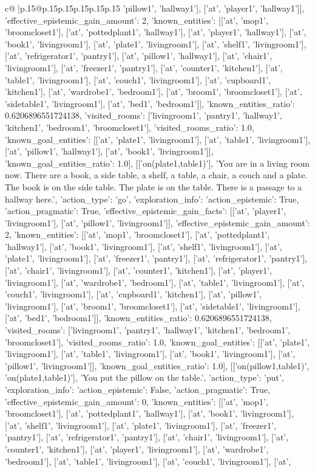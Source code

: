 \documentclass{article}
\begin{document}
{\begin{supertabular}{c@{$\;$}|p{.15\linewidth}@{}p{.15\linewidth}p{.15\linewidth}p{.15\linewidth}p{.15\linewidth}p{.15\linewidth}}
{{{'pillow1', 'hallway1'], ['at', 'player1', 'hallway1']], 'effective_epistemic_gain_amount': 2, 'known_entities': [['at', 'mop1', 'broomcloset1'], ['at', 'pottedplant1', 'hallway1'], ['at', 'player1', 'hallway1'], ['at', 'book1', 'livingroom1'], ['at', 'plate1', 'livingroom1'], ['at', 'shelf1', 'livingroom1'], ['at', 'refrigerator1', 'pantry1'], ['at', 'pillow1', 'hallway1'], ['at', 'chair1', 'livingroom1'], ['at', 'freezer1', 'pantry1'], ['at', 'counter1', 'kitchen1'], ['at', 'table1', 'livingroom1'], ['at', 'couch1', 'livingroom1'], ['at', 'cupboard1', 'kitchen1'], ['at', 'wardrobe1', 'bedroom1'], ['at', 'broom1', 'broomcloset1'], ['at', 'sidetable1', 'livingroom1'], ['at', 'bed1', 'bedroom1']], 'known_entities_ratio': 0.6206896551724138, 'visited_rooms': ['livingroom1', 'pantry1', 'hallway1', 'kitchen1', 'bedroom1', 'broomcloset1'], 'visited_rooms_ratio': 1.0, 'known_goal_entities': [['at', 'plate1', 'livingroom1'], ['at', 'table1', 'livingroom1'], ['at', 'pillow1', 'hallway1'], ['at', 'book1', 'livingroom1']], 'known_goal_entities_ratio': 1.0}}], [['on(plate1,table1)'], 'You are in a living room now. There are a book, a side table, a shelf, a table, a chair, a couch and a plate. The book is on the side table. The plate is on the table. There is a passage to a hallway here.', {'action_type': 'go', 'exploration_info': {'action_epistemic': True, 'action_pragmatic': True, 'effective_epistemic_gain_facts': [['at', 'player1', 'livingroom1'], ['at', 'pillow1', 'livingroom1']], 'effective_epistemic_gain_amount': 2, 'known_entities': [['at', 'mop1', 'broomcloset1'], ['at', 'pottedplant1', 'hallway1'], ['at', 'book1', 'livingroom1'], ['at', 'shelf1', 'livingroom1'], ['at', 'plate1', 'livingroom1'], ['at', 'freezer1', 'pantry1'], ['at', 'refrigerator1', 'pantry1'], ['at', 'chair1', 'livingroom1'], ['at', 'counter1', 'kitchen1'], ['at', 'player1', 'livingroom1'], ['at', 'wardrobe1', 'bedroom1'], ['at', 'table1', 'livingroom1'], ['at', 'couch1', 'livingroom1'], ['at', 'cupboard1', 'kitchen1'], ['at', 'pillow1', 'livingroom1'], ['at', 'broom1', 'broomcloset1'], ['at', 'sidetable1', 'livingroom1'], ['at', 'bed1', 'bedroom1']], 'known_entities_ratio': 0.6206896551724138, 'visited_rooms': ['livingroom1', 'pantry1', 'hallway1', 'kitchen1', 'bedroom1', 'broomcloset1'], 'visited_rooms_ratio': 1.0, 'known_goal_entities': [['at', 'plate1', 'livingroom1'], ['at', 'table1', 'livingroom1'], ['at', 'book1', 'livingroom1'], ['at', 'pillow1', 'livingroom1']], 'known_goal_entities_ratio': 1.0}}], [['on(pillow1,table1)', 'on(plate1,table1)'], 'You put the pillow on the table.', {'action_type': 'put', 'exploration_info': {'action_epistemic': False, 'action_pragmatic': True, 'effective_epistemic_gain_amount': 0, 'known_entities': [['at', 'mop1', 'broomcloset1'], ['at', 'pottedplant1', 'hallway1'], ['at', 'book1', 'livingroom1'], ['at', 'shelf1', 'livingroom1'], ['at', 'plate1', 'livingroom1'], ['at', 'freezer1', 'pantry1'], ['at', 'refrigerator1', 'pantry1'], ['at', 'chair1', 'livingroom1'], ['at', 'counter1', 'kitchen1'], ['at', 'player1', 'livingroom1'], ['at', 'wardrobe1', 'bedroom1'], ['at', 'table1', 'livingroom1'], ['at', 'couch1', 'livingroom1'], ['at', }}}
\end{supertabular}}
\end{document}
